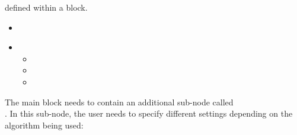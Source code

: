 defined within a  block.
%
\attrIntro
\begin{itemize}
\itemsep0em
\item \nameDescription
\end{itemize}
\begin{itemize}
  \item \variableDescription
    \variableChildrenIntro
    \begin{itemize}
      \item \distributionDescription
      \item \functionDescription
      \item \gridDescription
    \end{itemize}
\end{itemize}

The main  block needs to contain an additional sub-node
called\\.
%
In this sub-node, the user needs to specify different settings depending on the
algorithm being used:
